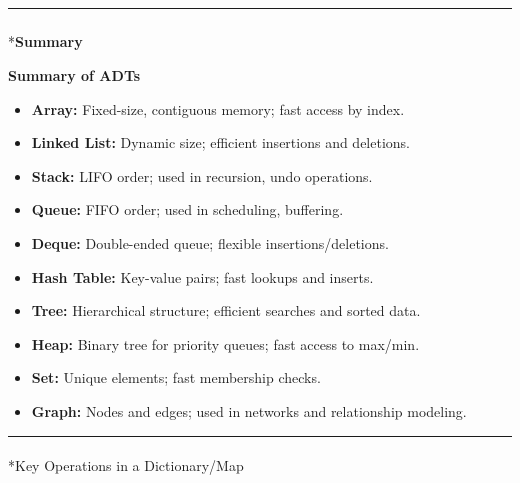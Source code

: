 \documentclass[
  letterpaper,
  DIV=11,
  numbers=noendperiod]{scrreprt}
\makeatletter
\let\oldparagraph\paragraph
\renewcommand{\paragraph}{
    \@ifstar
      \xxxParagraphStar
      \xxxParagraphNoStar
  }
\newcommand{\xxxParagraphStar}[1]{\oldparagraph*{#1}\mbox{}}
\newcommand{\xxxParagraphNoStar}[1]{\oldparagraph{#1}\mbox{}}
\let\oldsubparagraph\subparagraph
\renewcommand{\subparagraph}{
    \@ifstar
      \xxxSubParagraphStar
      \xxxSubParagraphNoStar
  }
\newcommand{\xxxSubParagraphStar}[1]{\oldsubparagraph*{#1}\mbox{}}
\newcommand{\xxxSubParagraphNoStar}[1]{\oldsubparagraph{#1}\mbox{}}
\providecommand{\tightlist}{%
  \setlength{\itemsep}{0pt}\setlength{\parskip}{0pt}}
\makeatother
\begin{document}
\begin{center}\rule{0.5\linewidth}{0.5pt}\end{center}

\subparagraph*{\texorpdfstring{\textbf{Summary}}{Summary}}\label{summary-1}

\begin{tcolorbox}[enhanced jigsaw, colframe=quarto-callout-note-color-frame, toprule=.15mm, bottomrule=.15mm, rightrule=.15mm, colback=white, breakable, arc=.35mm, opacityback=0, left=2mm, leftrule=.75mm]

\vspace{-3mm}\textbf{Summary of ADTs}\vspace{3mm}

\begin{itemize}
\tightlist
\item
  \textbf{Array:} Fixed-size, contiguous memory; fast access by index.
\item
  \textbf{Linked List:} Dynamic size; efficient insertions and
  deletions.
\item
  \textbf{Stack:} LIFO order; used in recursion, undo operations.
\item
  \textbf{Queue:} FIFO order; used in scheduling, buffering.
\item
  \textbf{Deque:} Double-ended queue; flexible insertions/deletions.
\item
  \textbf{Hash Table:} Key-value pairs; fast lookups and inserts.
\item
  \textbf{Tree:} Hierarchical structure; efficient searches and sorted
  data.
\item
  \textbf{Heap:} Binary tree for priority queues; fast access to
  max/min.
\item
  \textbf{Set:} Unique elements; fast membership checks.
\item
  \textbf{Graph:} Nodes and edges; used in networks and relationship
  modeling.
\end{itemize}

\end{tcolorbox}

\begin{center}\rule{0.5\linewidth}{0.5pt}\end{center}

\paragraph*{Key Operations in a
Dictionary/Map}\label{key-operations-in-a-dictionarymap}
\end{document}

